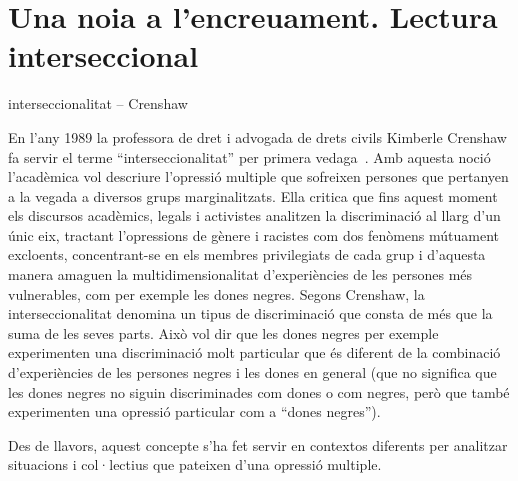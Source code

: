 \section{Una noia a l'encreuament. Lectura interseccional}

  interseccionalitat -- Crenshaw

En l'any 1989 la professora de dret i advogada de drets civils Kimberle Crenshaw fa servir el terme ``interseccionalitat'' per primera vedaga~\autocite{Crenshaw1989}.
Amb aquesta noció l'acadèmica vol descriure l'opressió multiple que sofreixen persones que pertanyen a la vegada a diversos grups marginalitzats.
Ella critica que fins aquest moment els discursos acadèmics, legals i activistes analitzen la discriminació al llarg d'un únic eix,
tractant l'opressions de gènere i racistes com dos fenòmens mútuament excloents,
concentrant-se en els membres privilegiats de cada grup i d'aquesta manera amaguen la multidimensionalitat d'experiències de les persones més vulnerables, com per exemple les dones negres.
Segons Crenshaw, la interseccionalitat denomina un tipus de discriminació que consta de més que la suma de les seves parts.
Això vol dir que les dones negres per exemple experimenten una discriminació molt particular que és diferent de la combinació d'experiències de les persones negres i les dones en general (que no significa que les dones negres no siguin discriminades com dones o com negres, però que també experimenten una opressió particular com a ``dones negres'').

Des de llavors, aquest concepte s'ha fet servir en contextos diferents per analitzar situacions i col·lectius que pateixen d'una opressió multiple.

